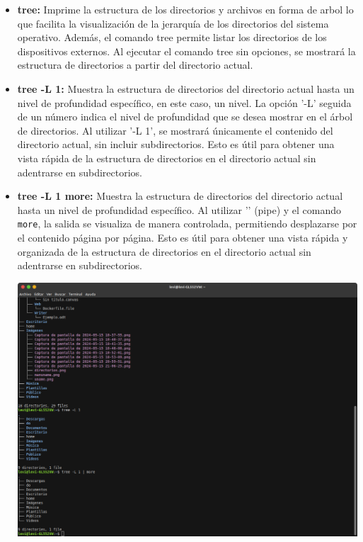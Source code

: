 \documentclass[11pt,twoside]{book}
\begin{document}
\begin{enumerate}
\begin{itemize}
      \item\textbf{tree: } Imprime la estructura de los directorios y archivos en forma de arbol lo que facilita la visualización de la jerarquía de los directorios del sistema operativo. Además, el comando tree permite listar los directorios de los dispositivos externos. Al ejecutar el comando tree sin opciones, se mostrará la estructura de directorios a partir del directorio actual.
      \item\textbf{tree -L 1: } Muestra la estructura de directorios del directorio actual hasta un nivel de profundidad específico, en este caso, un nivel. La opción '-L' seguida de un número indica el nivel de profundidad que se desea mostrar en el árbol de directorios. Al utilizar '-L 1', se mostrará únicamente el contenido del directorio actual, sin incluir subdirectorios. Esto es útil para obtener una vista rápida de la estructura de directorios en el directorio actual sin adentrarse en subdirectorios.
      \item \textbf{tree -L 1 \textbar{} more:} Muestra la estructura de directorios del directorio actual hasta un nivel de profundidad específico. Al utilizar '\texttt{\textbar{}}' (pipe) y el comando \texttt{more}, la salida se visualiza de manera controlada, permitiendo desplazarse por el contenido página por página. Esto es útil para obtener una vista rápida y organizada de la estructura de directorios en el directorio actual sin adentrarse en subdirectorios.

      \begin{minipage}{\linewidth}
        \centering
        \includegraphics[width=1\linewidth]{tree.png}
        \label{fig:etiqueta}
    \end{minipage}\\
    

\end{itemize}
\end{enumerate}
\end{document}
